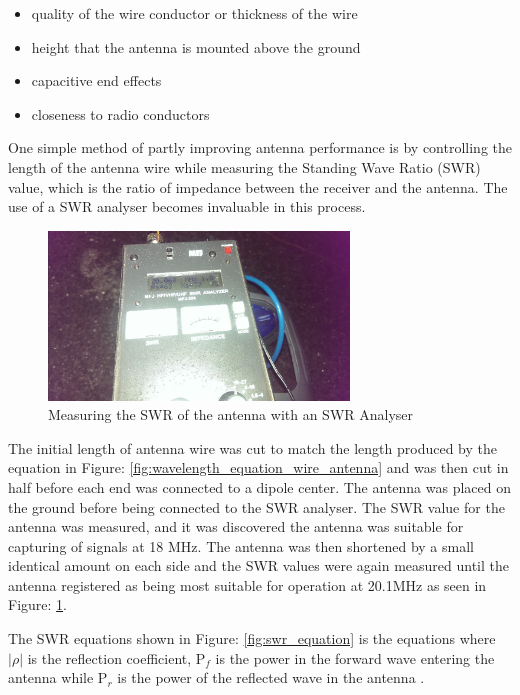 \documentclass[runningheads,a4paper]{llncs}
\begin{document}
\begin{itemize}
	\item quality of the wire conductor or thickness of the wire
	\item height that the antenna is mounted above the ground
	\item capacitive end effects
	\item closeness to radio conductors
\end{itemize}

One simple method of partly improving antenna performance is by controlling the length of the antenna wire while measuring the Standing Wave Ratio (\gls{SWR}) value, which is the ratio of impedance between the receiver and the antenna. The use of a \gls{SWR} analyser becomes invaluable in this process.

%
\begin{figure}[here]
\centering
\includegraphics[width=8cm]{images/34}
\caption{Measuring the SWR of the antenna with an SWR Analyser}
\label{fig:swr_analyser_measuring_antenna}
\end{figure}
%

The initial length of antenna wire was cut to match the length produced by the equation in Figure: \ref{fig:wavelength_equation_wire_antenna} and was then cut in half before each end was connected to a dipole center. The antenna was placed on the ground before being connected to the \gls{SWR} analyser. The \gls{SWR} value for the antenna was measured, and it was discovered the antenna was suitable for capturing of signals at 18 MHz. The antenna was then shortened by a small identical amount on each side and the \gls{SWR} values were again measured until the antenna registered as being most suitable for operation at 20.1MHz as seen in Figure:  \ref{fig:swr_analyser_measuring_antenna}. 

The \gls{SWR} equations shown in Figure: \ref{fig:swr_equation} is the  equations where $|\rho|$ is the reflection coefficient, P$_{f}$ is the power in the forward wave entering the antenna while P$_{r}$ is the power of the reflected wave in the antenna \citep{arrl-00}.
\end{document}
